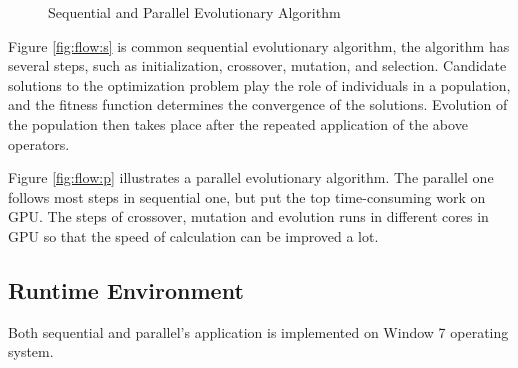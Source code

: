 \begin{figure}[!ht]
\begin{minipage}{0.29\textwidth}
{    }
  \end{minipage}
  \begin{minipage}{0.58\textwidth}
    \centering
  \end{minipage}
  \caption{Sequential and Parallel Evolutionary Algorithm}
  \label{fig:flow}
\end{figure}


Figure \ref{fig:flow:s} is common sequential evolutionary algorithm, the
algorithm has several steps, such as initialization, crossover, mutation, and
selection. Candidate solutions to the optimization problem play the role of
individuals in a population, and the fitness function determines the convergence
of the solutions. Evolution of the population then takes place after the
repeated application of the above operators.


Figure \ref{fig:flow:p} illustrates a parallel evolutionary algorithm. The
parallel one follows most steps in sequential one, but put the top
time-consuming work on GPU. The steps of crossover, mutation and evolution runs
in different cores in GPU so that the speed of calculation can be improved a lot.


\subsection{Runtime Environment}
%
Both sequential and parallel's application is implemented on Window 7 operating
system.

